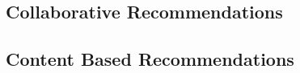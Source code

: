 
\subsection{Collaborative Recommendations}
\label{Collaborative}

\subsection{Content Based Recommendations}
\label{ContentBased}
